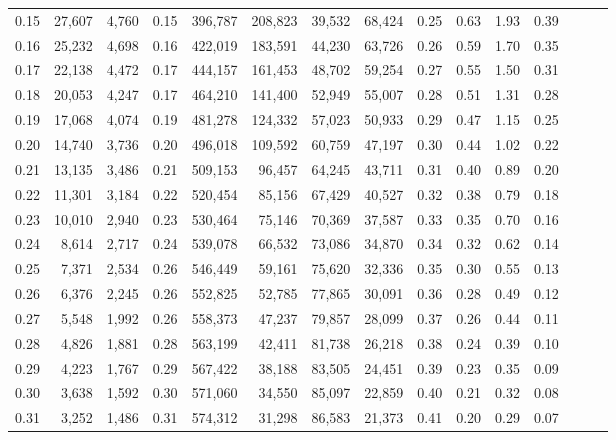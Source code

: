 \begin{tabular}{rrrrrrrrrrrrrrr}
0.15 &  27,607 &  4,760 &  0.15 &  396,787 &  208,823 &   39,532 &   68,424 &  0.25 &  0.63 &  1.93 &      0.39 \\
0.16 &  25,232 &  4,698 &  0.16 &  422,019 &  183,591 &   44,230 &   63,726 &  0.26 &  0.59 &  1.70 &      0.35 \\
0.17 &  22,138 &  4,472 &  0.17 &  444,157 &  161,453 &   48,702 &   59,254 &  0.27 &  0.55 &  1.50 &      0.31 \\
0.18 &  20,053 &  4,247 &  0.17 &  464,210 &  141,400 &   52,949 &   55,007 &  0.28 &  0.51 &  1.31 &      0.28 \\
0.19 &  17,068 &  4,074 &  0.19 &  481,278 &  124,332 &   57,023 &   50,933 &  0.29 &  0.47 &  1.15 &      0.25 \\
0.20 &  14,740 &  3,736 &  0.20 &  496,018 &  109,592 &   60,759 &   47,197 &  0.30 &  0.44 &  1.02 &      0.22 \\
0.21 &  13,135 &  3,486 &  0.21 &  509,153 &   96,457 &   64,245 &   43,711 &  0.31 &  0.40 &  0.89 &      0.20 \\
0.22 &  11,301 &  3,184 &  0.22 &  520,454 &   85,156 &   67,429 &   40,527 &  0.32 &  0.38 &  0.79 &      0.18 \\
0.23 &  10,010 &  2,940 &  0.23 &  530,464 &   75,146 &   70,369 &   37,587 &  0.33 &  0.35 &  0.70 &      0.16 \\
0.24 &   8,614 &  2,717 &  0.24 &  539,078 &   66,532 &   73,086 &   34,870 &  0.34 &  0.32 &  0.62 &      0.14 \\
0.25 &   7,371 &  2,534 &  0.26 &  546,449 &   59,161 &   75,620 &   32,336 &  0.35 &  0.30 &  0.55 &      0.13 \\
0.26 &   6,376 &  2,245 &  0.26 &  552,825 &   52,785 &   77,865 &   30,091 &  0.36 &  0.28 &  0.49 &      0.12 \\
0.27 &   5,548 &  1,992 &  0.26 &  558,373 &   47,237 &   79,857 &   28,099 &  0.37 &  0.26 &  0.44 &      0.11 \\
0.28 &   4,826 &  1,881 &  0.28 &  563,199 &   42,411 &   81,738 &   26,218 &  0.38 &  0.24 &  0.39 &      0.10 \\
0.29 &   4,223 &  1,767 &  0.29 &  567,422 &   38,188 &   83,505 &   24,451 &  0.39 &  0.23 &  0.35 &      0.09 \\
0.30 &   3,638 &  1,592 &  0.30 &  571,060 &   34,550 &   85,097 &   22,859 &  0.40 &  0.21 &  0.32 &      0.08 \\
0.31 &   3,252 &  1,486 &  0.31 &  574,312 &   31,298 &   86,583 &   21,373 &  0.41 &  0.20 &  0.29 &      0.07 \\

\end{tabular}

